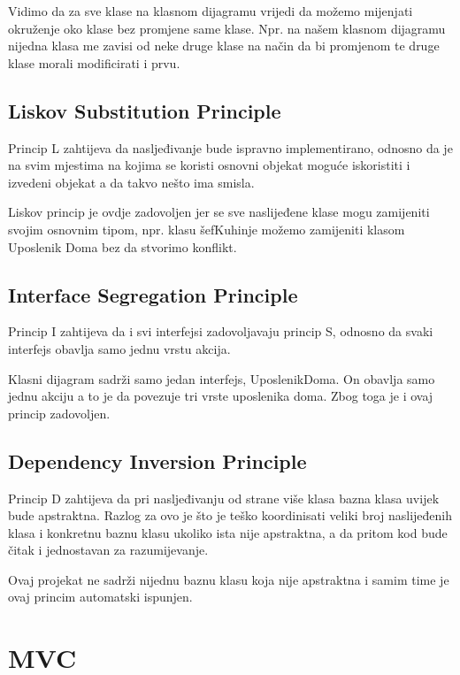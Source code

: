 \documentclass{article}
\begin{document}
Vidimo da za sve klase na klasnom dijagramu vrijedi da možemo mijenjati okruženje oko klase bez promjene same klase. Npr. na našem klasnom dijagramu nijedna klasa me zavisi od neke druge klase na način da bi promjenom te druge klase morali modificirati i prvu.

\subsection{Liskov Substitution Principle}

\hspace{\indent}Princip L zahtijeva da nasljeđivanje bude ispravno implementirano, odnosno da je na svim mjestima na kojima se koristi osnovni objekat moguće iskoristiti i izvedeni objekat a da takvo nešto ima smisla.

Liskov princip je ovdje zadovoljen jer se sve naslijeđene klase mogu zamijeniti svojim osnovnim tipom, npr. klasu šefKuhinje možemo zamijeniti klasom Uposlenik Doma bez da stvorimo konflikt. 

\subsection{Interface Segregation Principle} 

\hspace{\indent}Princip I zahtijeva da i svi interfejsi zadovoljavaju princip S, odnosno da svaki interfejs obavlja samo jednu vrstu akcija.

Klasni dijagram sadrži samo jedan interfejs, UposlenikDoma. On obavlja samo jednu akciju a to je da povezuje tri vrste uposlenika doma. Zbog toga je i ovaj princip zadovoljen.



\subsection{Dependency Inversion Principle}

Princip D zahtijeva da pri nasljeđivanju od strane više klasa bazna klasa uvijek bude apstraktna. Razlog za ovo je što je teško koordinisati veliki broj naslijeđenih klasa i konkretnu baznu klasu ukoliko ista nije apstraktna, a da pritom kod bude čitak i jednostavan za razumijevanje.

Ovaj projekat ne sadrži nijednu baznu klasu koja nije apstraktna i samim time je ovaj princim automatski ispunjen.

\newpage



\section{MVC}
\end{document}
